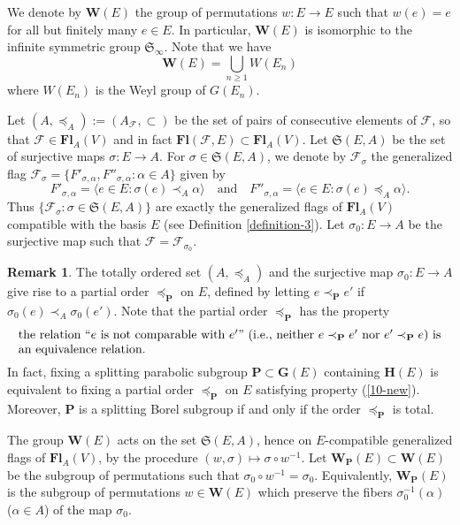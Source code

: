 \documentclass[12pt]{amsart}
\theoremstyle{definition}
\newtheorem{remark}{Remark}
\begin{document}
We denote by $\mathbf{W}(E)$ the group of permutations
$w:E\to E$ such that $w(e)=e$ for all but finitely many $e\in E$.
In particular, $\mathbf{W}(E)$ is isomorphic to the infinite symmetric group $\mathfrak{S}_\infty$.
Note that we have
\[\mathbf{W}(E)=\bigcup_{n\geq 1}W(E_n)\]
where $W(E_n)$ is the Weyl group of $G(E_n)$.

Let $(A,\preceq_A):=(A_\mathcal{F},\subset)$ be the set of pairs of consecutive elements of $\mathcal{F}$, so that $\mathcal{F}\in\mathbf{Fl}_A(V)$ and in fact $\mathbf{Fl}(\mathcal{F},E)\subset\mathbf{Fl}_A(V)$. Let $\mathfrak{S}(E,A)$ be the set of surjective maps $\sigma:E\to A$. For $\sigma\in\mathfrak{S}(E,A)$,
we denote by $\mathcal{F}_\sigma$ the generalized flag $\mathcal{F}_\sigma=\{F'_{\sigma,\alpha},F''_{\sigma,\alpha}:\alpha\in A\}$ given by
\begin{equation}
\label{relation-8}
F'_{\sigma,\alpha}=\langle e\in E:\sigma(e)\prec_A \alpha\rangle\quad\mbox{and}\quad F''_{\sigma,\alpha}=\langle e\in E:\sigma(e)\preceq_A\alpha\rangle.
\end{equation}
Thus $\{\mathcal{F}_\sigma:\sigma\in\mathfrak{S}(E,A)\}$ are exactly the generalized flags of $\mathbf{Fl}_A(V)$ compatible with the basis $E$ (see Definition \ref{definition-3}).
Let $\sigma_0:E\to A$ be the surjective map such that $\mathcal{F}=\mathcal{F}_{\sigma_0}$.

\begin{remark}
\label{remark-4}
The totally ordered set $(A,\preceq_A)$ and the surjective map $\sigma_0:E\to A$ give rise to a partial order $\preceq_\mathbf{P}$ on $E$, defined by letting $e\prec_\mathbf{P}e'$ if $\sigma_0(e)\prec_A\sigma_0(e')$.
Note that the partial order $\preceq_\mathbf{P}$ has the property
\begin{equation}
\label{10-new}
\parbox{12cm}{the relation ``$e$ is not comparable with $e'$'' (i.e., neither $e\prec_\mathbf{P}e'$ nor $e'\prec_\mathbf{P}e$) is an equivalence relation.}
\end{equation}
In fact, fixing
a splitting parabolic subgroup $\mathbf{P}\subset\mathbf{G}(E)$ containing $\mathbf{H}(E)$ is equivalent to fixing a partial order $\preceq_\mathbf{P}$ on $E$ satisfying property (\ref{10-new}). Moreover, $\mathbf{P}$ is a splitting Borel subgroup if and only if the order $\preceq_\mathbf{P}$ is total.
\end{remark}

The group $\mathbf{W}(E)$ acts on the set $\mathfrak{S}(E,A)$, hence on $E$-compatible generalized flags of $\mathbf{Fl}_A(V)$, by the procedure $(w,\sigma)\mapsto \sigma\circ w^{-1}$.
Let $\mathbf{W}_\mathbf{P}(E)\subset\mathbf{W}(E)$ be the subgroup of permutations such that $\sigma_0\circ w^{-1}=\sigma_0$.
Equivalently,
$\mathbf{W}_\mathbf{P}(E)$ is the subgroup of permutations $w\in\mathbf{W}(E)$
which preserve the fibers $\sigma_0^{-1}(\alpha)$ ($\alpha\in A$) of the map $\sigma_0$.
\end{document}
